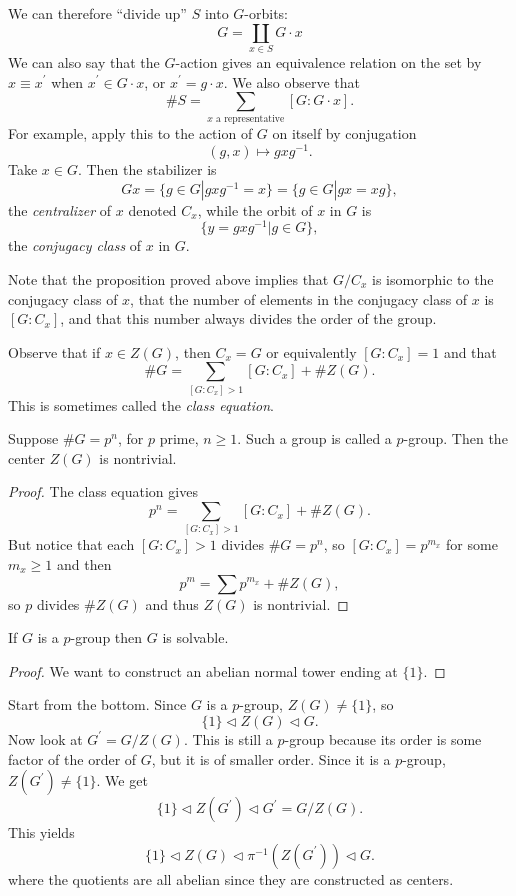 We can therefore ``divide up'' $S$ into $G$-orbits:
$$
G = \coprod_{x \in S} G \cdot x
$$
We can also say that the $G$-action gives an equivalence relation on
the set by $x \equiv x^\prime$ when $x^\prime \in G \cdot x$, or
$x^\prime = g \cdot x$. We also observe that
$$
\# S = \sum_{x \text{ a representative}} [G : G \cdot x].
$$
For example, apply this to the action of $G$ on itself by conjugation
$$
(g, x) \mapsto g x g^{-1}.
$$
Take $x \in G$. Then the stabilizer is
$$
G x = \{ g \in G | gxg^{-1} = x \}
    = \{ g \in G | gx = xg \},
$$
the \emph{centralizer} of $x$ denoted $C_x$, while the orbit of $x$ in $G$ is
$$
\{ y = gxg^{-1} | g \in G \},
$$
the \emph{conjugacy class} of $x$ in $G$.

Note that the proposition proved above implies that $G / C_x$ is
isomorphic to the conjugacy class of $x$, that the number of elements
in the conjugacy class of $x$ is $[G : C_x]$, and that this number
always divides the order of the group.

Observe that if $x \in Z(G)$, then $C_x = G$ or equivalently
$[G : C_x] = 1$ and that
$$
\# G = \sum_{[G : C_x] > 1} [G : C_x] + \# Z(G).
$$
This is sometimes called the \emph{class equation}.

\begin{corol}
Suppose $\# G = p^n$, for $p$ prime, $n \geq 1$. Such a group is called a
$p$-group. Then the center $Z(G)$ is nontrivial.
\end{corol}

\begin{proof}
The class equation gives
$$
p^n = \sum_{[G : C_x] > 1} [G : C_x] + \# Z(G).
$$
But notice that each $[G : C_x] > 1$ divides
$\# G = p^n$, so $[G : C_x] = p^{m_x}$ for some $m_x \geq 1$
and then
$$
p^m = \sum p^{m_x} + \# Z(G),
$$
so $p$ divides $\# Z(G)$ and thus $Z(G)$ is nontrivial.
\end{proof}

\begin{corol}
If $G$ is a $p$-group then $G$ is solvable.
\end{corol}
\begin{proof}
We want to construct an abelian normal tower ending at $\{ 1 \}$.
\end{proof}
Start from the bottom. Since $G$ is a $p$-group, $Z(G) \neq \{1\}$, so
$$
\{1\} \triangleleft Z(G) \triangleleft G.
$$
Now look at $G^\prime = G / Z(G)$. This is still a $p$-group because
its order is some factor of the order of $G$, but it is of smaller
order. Since it is a $p$-group, $Z(G^\prime) \neq \{1\}$. We get
$$
\{ 1 \} \triangleleft Z(G^\prime) \triangleleft G^\prime = G / Z(G).
$$
This yields
$$
\{1\}
  \triangleleft Z(G)
  \triangleleft \pi^{-1}(Z(G^\prime))
  \triangleleft G.
$$
where the quotients are all abelian since they are constructed as
centers.

